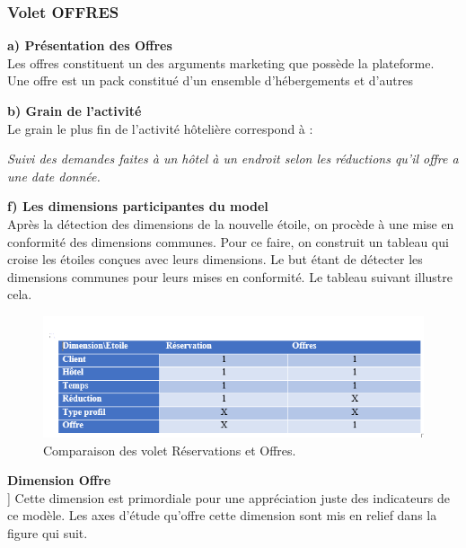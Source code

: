  \subsubsection{Volet OFFRES}
\textbf{a)	Présentation des Offres}\\

Les offres constituent un des arguments marketing que possède la plateforme. Une offre est un pack constitué d’un ensemble d’hébergements et d’autres 

\textbf{b)	Grain de l’activité}\\
Le grain le plus fin de l’activité hôtelière correspond à : 
\begin{center}
\textit{Suivi des demandes faites à un hôtel à un endroit selon les réductions qu’il offre a une date donnée.}
\end{center}
\cleardoublepage
\textbf{f)	Les dimensions participantes du model}\\

Après la détection des dimensions de la nouvelle étoile, on procède à une mise en conformité des dimensions communes. Pour ce faire, on construit un tableau qui croise les étoiles conçues avec leurs dimensions. Le but étant de détecter les dimensions communes pour leurs mises en conformité. Le tableau suivant illustre cela.

\begin{figure}[!htbp]
	\begin{center}
		\includegraphics[scale=0.95]{images/tab_conform.png}
		\caption{Comparaison des volet Réservations et Offres.}
		\label{use_bi_tools}
	\end{center}
	\end{figure}

\textbf{Dimension Offre}\\]
 Cette dimension est primordiale pour une appréciation juste des indicateurs de ce modèle. Les axes d’étude qu’offre cette dimension sont mis en relief dans la figure qui suit. 

